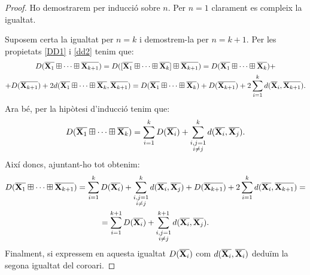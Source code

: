 \documentclass{article}
\theoremstyle{math}
\newcommand{\0}{\ensuremath{\vb{0}}}
\newcommand{\X}{\ensuremath{\vb{X}}}
\begin{document}
\begin{proof}
    Ho demostrarem per inducció sobre $n$. Per $n=1$ clarament es compleix la igualtat.\par Suposem certa la igualtat per $n=k$ i demostrem-la per $n=k+1$. Per les propietats \ref{DD1} i \ref{dd2} tenim que:
    \begin{multline*}
        D(\overline{\X_1}\boxplus\cdots\boxplus\overline{\X_{k+1}})=D([\overline{\X_1}\boxplus\cdots\boxplus\overline{\X_k}]\boxplus\overline{\X_{k+1}})=D(\overline{\X_1}\boxplus\cdots\boxplus\overline{\X_k})+\\+D(\overline{\X_{k+1}})+2d(\overline{\X_1}\boxplus\cdots\boxplus\overline{\X_k},\overline{\X_{k+1}})=D(\overline{\X_1}\boxplus\cdots\boxplus\overline{\X_k})+D(\overline{\X_{k+1}})+2\sum_{i=1}^kd(\overline{\X}_i,\overline{\X_{k+1}}).
    \end{multline*}
    Ara bé, per la hipòtesi d'inducció tenim que:
    $$D(\overline{\X_1}\boxplus\cdots\boxplus\overline{\X_k})=\sum_{i=1}^kD(\overline{\X_i})+\sum_{\substack{i,j=1\\i\ne j}}^kd(\overline{\X_i},\overline{\X_j}).$$ Així doncs, ajuntant-ho tot obtenim:
    \begin{multline*}
        D(\overline{\X_1}\boxplus\cdots\boxplus\overline{\X_{k+1}})=\sum_{i=1}^kD(\overline{\X_i})+\sum_{\substack{i,j=1\\i\ne j}}^kd(\overline{\X_i},\overline{\X_j})+D(\overline{\X_{k+1}})+2\sum_{i=1}^kd(\overline{\X_i},\overline{\X_{k+1}})=\\=\sum_{i=1}^{k+1}D(\overline{\X_i})+\sum_{\substack{i,j=1\\i\ne j}}^{k+1}d(\overline{\X_i},\overline{\X_j}).
    \end{multline*}
    Finalment, si expressem en aquesta igualtat $D(\overline{\X_i})$ com $d(\overline{\X_i},\overline{\X_i})$ deduïm la segona igualtat del coro\lgem ari.
\end{proof}
\end{document}
